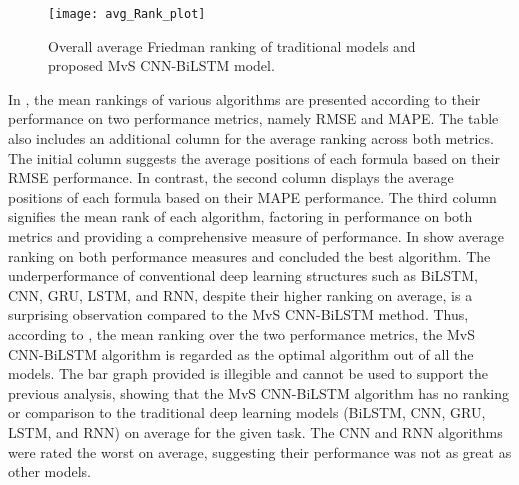   \begin{figure*}[h!]
    \centering
    \texttt{[image: avg\_Rank\_plot]}
    \caption{Overall average Friedman ranking of traditional models and proposed MvS CNN-BiLSTM model.}
    \label{avg_Rank_plot}
  \end{figure*}
  In ,  the mean rankings of various algorithms are presented according to their performance on two performance metrics,  namely RMSE and MAPE. The table also includes an additional column for the average ranking across both metrics. The initial column suggests the average positions of each formula based on their RMSE performance. In contrast, the second column displays the average positions of each formula based on their MAPE performance. The third column signifies the mean rank of each algorithm,  factoring in performance on both metrics and providing a comprehensive measure of performance. In  show average ranking on both performance measures and concluded the best algorithm. The underperformance of conventional deep learning structures such as BiLSTM,  CNN,  GRU,  LSTM,  and RNN,  despite their higher ranking on average,  is a surprising observation compared to the MvS CNN-BiLSTM method. Thus,  according to , the mean ranking over the two performance metrics,  the MvS CNN-BiLSTM algorithm is regarded as the optimal algorithm out of all the models. The bar graph provided is illegible and cannot be used to support the previous analysis,  showing that the MvS CNN-BiLSTM algorithm has no ranking or comparison to the traditional deep learning models (BiLSTM,  CNN,  GRU,  LSTM,  and RNN) on average for the given task. The CNN and RNN algorithms were rated the worst on average,  suggesting their performance was not as great as other models.



